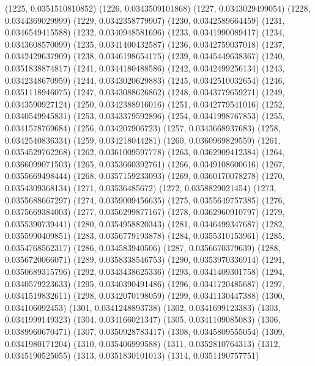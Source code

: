 {					(1225, 0.0351510810852)
					(1226, 0.0343509101868)
					(1227, 0.0343029499054)
					(1228, 0.0344369029999)
					(1229, 0.0342358779907)
					(1230, 0.0342589664459)
					(1231, 0.0346549415588)
					(1232, 0.0340948581696)
					(1233, 0.0341990089417)
					(1234, 0.0343608570099)
					(1235, 0.0341400432587)
					(1236, 0.0342759037018)
					(1237, 0.0342429637909)
					(1238, 0.0346198654175)
					(1239, 0.0345449638367)
					(1240, 0.0351838874817)
					(1241, 0.0344180488586)
					(1242, 0.0342499256134)
					(1243, 0.0342348670959)
					(1244, 0.0343020629883)
					(1245, 0.0342510032654)
					(1246, 0.0351118946075)
					(1247, 0.0343088626862)
					(1248, 0.0343779659271)
					(1249, 0.0343590927124)
					(1250, 0.0342388916016)
					(1251, 0.0342779541016)
					(1252, 0.0340549945831)
					(1253, 0.0343379592896)
					(1254, 0.0341998767853)
					(1255, 0.0341578769684)
					(1256, 0.034207906723)
					(1257, 0.0343668937683)
					(1258, 0.0342540836334)
					(1259, 0.034218044281)
					(1260, 0.0360969829559)
					(1261, 0.0354529762268)
					(1262, 0.0361009597778)
					(1263, 0.0362909412384)
					(1264, 0.0366099071503)
					(1265, 0.0353660392761)
					(1266, 0.0349108600616)
					(1267, 0.0355669498444)
					(1268, 0.0357159233093)
					(1269, 0.0360170078278)
					(1270, 0.0354309368134)
					(1271, 0.03536485672)
					(1272, 0.0358829021454)
					(1273, 0.0355688667297)
					(1274, 0.0359009456635)
					(1275, 0.0355649757385)
					(1276, 0.0375669384003)
					(1277, 0.0356299877167)
					(1278, 0.0362960910797)
					(1279, 0.0355390739441)
					(1280, 0.0354958820343)
					(1281, 0.0346499347687)
					(1282, 0.0355990409851)
					(1283, 0.0356779193878)
					(1284, 0.0355310153961)
					(1285, 0.0354768562317)
					(1286, 0.034583940506)
					(1287, 0.0356670379639)
					(1288, 0.0356720066071)
					(1289, 0.0358338546753)
					(1290, 0.0353970336914)
					(1291, 0.0350689315796)
					(1292, 0.0343438625336)
					(1293, 0.0341409301758)
					(1294, 0.0340579223633)
					(1295, 0.0340390491486)
					(1296, 0.0341720485687)
					(1297, 0.0341519832611)
					(1298, 0.0342070198059)
					(1299, 0.0341130447388)
					(1300, 0.034106092453)
					(1301, 0.0341248893738)
					(1302, 0.0341699123383)
					(1303, 0.0341999149323)
					(1304, 0.034166021347)
					(1305, 0.0341109085083)
					(1306, 0.0389960670471)
					(1307, 0.0350928783417)
					(1308, 0.0345809555054)
					(1309, 0.0341980171204)
					(1310, 0.035406999588)
					(1311, 0.0352810764313)
					(1312, 0.0345190525055)
					(1313, 0.0351830101013)
					(1314, 0.0351190757751)
}
